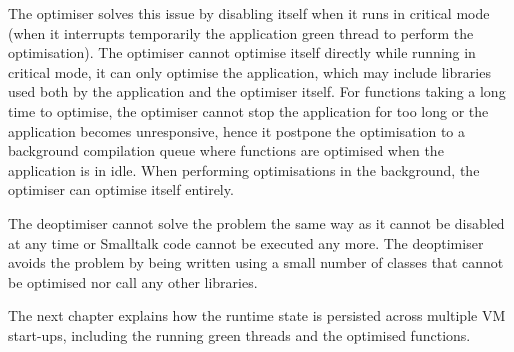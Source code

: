 \documentclass[a4paper,12pt,twoside]{../includes/ThesisStyle}
\begin{document}
The optimiser solves this issue by disabling itself when it runs in critical mode (when it interrupts temporarily the application green thread to perform the optimisation). The optimiser cannot optimise itself directly while running in critical mode, it can only optimise the  application, which may include libraries used both by the application and the optimiser itself. For functions taking a long time to optimise, the optimiser cannot stop the application for too long or the application becomes unresponsive, hence it postpone the optimisation to a background compilation queue where functions are optimised when the application is in idle. When performing optimisations in the background, the optimiser can optimise itself entirely.

The deoptimiser cannot solve the problem the same way as it cannot be disabled at any time or Smalltalk code cannot be executed any more. The deoptimiser avoids the problem by being written using a small number of classes that cannot be optimised nor call any other libraries.

The next chapter explains how the runtime state is persisted across multiple VM start-ups, including the running green threads and the optimised functions.

\ifx\wholebook\relax\else
    
\end{document}
